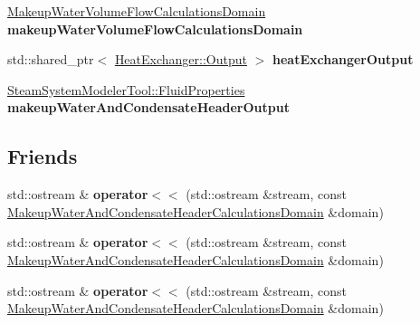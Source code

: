 \begin{DoxyCompactItemize}
\hyperlink{class_makeup_water_volume_flow_calculations_domain}{Makeup\+Water\+Volume\+Flow\+Calculations\+Domain} {\bfseries makeup\+Water\+Volume\+Flow\+Calculations\+Domain}
\item 
\mbox{\label{class_makeup_water_and_condensate_header_calculations_domain_af2a86077565d3708a47f174ed2a6f97f}} 
std\+::shared\+\_\+ptr$<$ \hyperlink{struct_heat_exchanger_1_1_output}{Heat\+Exchanger\+::\+Output} $>$ {\bfseries heat\+Exchanger\+Output}
\item 
\mbox{\label{class_makeup_water_and_condensate_header_calculations_domain_acbb1d889ee77fb5d54fe2abebc271891}} 
\hyperlink{struct_steam_system_modeler_tool_1_1_fluid_properties}{Steam\+System\+Modeler\+Tool\+::\+Fluid\+Properties} {\bfseries makeup\+Water\+And\+Condensate\+Header\+Output}
\end{DoxyCompactItemize}
\subsection*{Friends}
\begin{DoxyCompactItemize}
\item 
\mbox{\label{class_makeup_water_and_condensate_header_calculations_domain_a2d6058602bc26caf354a4666da4c2701}} 
std\+::ostream \& {\bfseries operator$<$$<$} (std\+::ostream \&stream, const \hyperlink{class_makeup_water_and_condensate_header_calculations_domain}{Makeup\+Water\+And\+Condensate\+Header\+Calculations\+Domain} \&domain)
\item 
\mbox{\label{class_makeup_water_and_condensate_header_calculations_domain_a2d6058602bc26caf354a4666da4c2701}} 
std\+::ostream \& {\bfseries operator$<$$<$} (std\+::ostream \&stream, const \hyperlink{class_makeup_water_and_condensate_header_calculations_domain}{Makeup\+Water\+And\+Condensate\+Header\+Calculations\+Domain} \&domain)
\item 
\mbox{\label{class_makeup_water_and_condensate_header_calculations_domain_a2d6058602bc26caf354a4666da4c2701}} 
std\+::ostream \& {\bfseries operator$<$$<$} (std\+::ostream \&stream, const \hyperlink{class_makeup_water_and_condensate_header_calculations_domain}{Makeup\+Water\+And\+Condensate\+Header\+Calculations\+Domain} \&domain)
\end{DoxyCompactItemize}



